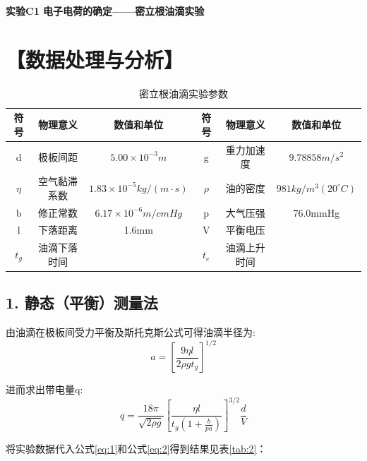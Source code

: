 \documentclass[12pt,a4paper,UTF8]{ctexart}
\begin{document}

\begin{center}
\LARGE\textbf{实验C1 电子电荷的确定——密立根油滴实验}
\end{center}



\section*{【数据处理与分析】}
\begin{table}[htbp]
	\caption{密立根油滴实验参数}
	\centering
    \begin{tabular}{ccc|ccc}
	\toprule
	符号 & 物理意义 & 数值和单位 & 符号 & 物理意义 & 数值和单位  \\
	\midrule
	d & 极板间距 & $5.00 \times 10^{-3}m$ & g & 重力加速度 & $9.78858 m/s^2$\\
	$\eta$ & 空气黏滞系数 & $1.83 \times 10^{-5}kg/(m \cdot s)$ & $\rho$ & 油的密度 & $981 kg/m^3 (20 ^{\circ}C)$\\
    b & 修正常数 & $6.17 \times 10^{-6}m/cmHg$ & p & 大气压强 & 76.0mmHg \\
    l & 下落距离 & 1.6mm & V & 平衡电压 & \\
    $t_g$ & 油滴下落时间 & & $t_e$ & 油滴上升时间 & \\
	\bottomrule
    \end{tabular}%
\label{tab:1}%
\end{table}

\subsection*{1.	静态（平衡）测量法}
由油滴在极板间受力平衡及斯托克斯公式可得油滴半径为:
\begin{equation}\label{eq:1}
    a=\left[\frac{9\eta l}{2\rho g t_g}\right]^{1/2} 
\end{equation}

进而求出带电量q:
\begin{equation}\label{eq:2}
    q=\frac{18\pi}{\sqrt{2\rho g}}\left[\frac{\eta l}{t_g \left(1+\frac{b}{pa}\right) }\right]^{3/2} \frac{d}{V} 
\end{equation}

将实验数据代入公式\ref{eq:1}和公式\ref*{eq:2}得到结果见表\ref*{tab:2}：
\end{document}
